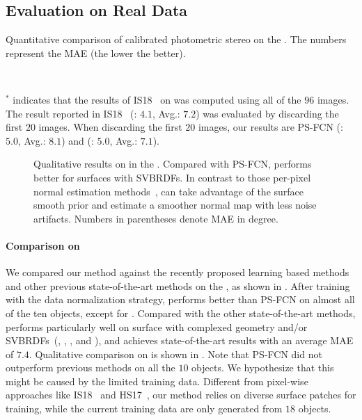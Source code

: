 \subsection{Evaluation on Real Data}
\label{sub:Evaluation on Real Data}

\begin{table}[htbp]
    \caption[Quantitative comparison on the \diligent]{Quantitative comparison of calibrated photometric stereo on the \diligent. The numbers represent the MAE (the lower the better).} 
    \label{tab:quant_main}
     \\
    \begin{flushleft}
        {\footnotesize $^*$ indicates that the results of IS18~\cite{ikehata2018cnn} on  was computed using all of the $96$ images. The result reported in IS18~\cite{ikehata2018cnn} (: $4.1$, Avg.: $7.2$) was evaluated by discarding the first $20$ images. When discarding the first $20$ images, our results are PS-FCN (: $5.0$, Avg.: $8.1$) and \PSFCNplusN (: $5.0$, Avg.: $7.1$).}
    \end{flushleft}
\end{table}

\begin{figure}[htbp] \centering
     
    \caption[Qualitative results on  in the \diligent]{Qualitative results on  in the \diligent. Compared with PS-FCN, \PSFCNplusN performs better for surfaces with SVBRDFs. In contrast to those per-pixel normal estimation methods~\cite{ikehata2018cnn,hui2017shape,santo2017deep}, \PSFCNplusN can take advantage of the surface smooth prior and estimate a smoother normal map with less noise artifacts. Numbers in parentheses denote MAE in degree.} \label{fig:res_harvest}
\end{figure}

\paragraph{Comparison on \Diligent}
We compared our method against the recently proposed learning based methods~\cite{santo2017deep,Taniai18,ikehata2018cnn} and other previous state-of-the-art methods on the \diligent, as shown in . 
After training with the data normalization strategy, \PSFCNplusN performs better than PS-FCN on almost all of the ten objects, except for .  
Compared with the other state-of-the-art methods, \PSFCNplusN performs particularly well on surface with complexed geometry and/or SVBRDFs~(\eg, , , and ), and achieves state-of-the-art results with an average MAE of $7.4$.
Qualitative comparison on  is shown in .
Note that PS-FCN did not outperform previous methods on all the $10$ objects. We hypothesize that this might be caused by the limited training data. Different from pixel-wise approaches like IS18~\cite{ikehata2018cnn} and HS17~\cite{hui2017shape}, our method relies on diverse surface patches for training, while the current training data are only generated from $18$ objects.

